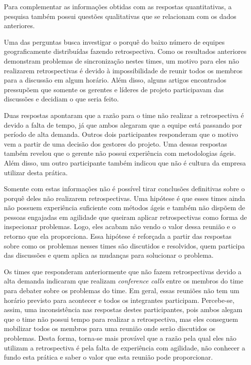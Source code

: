 Para complementar as informações obtidas com as respostas quantitativas, a pesquisa também possui questões qualitativas que se relacionam com os dados anteriores. 

Uma das perguntas busca investigar o porquê do baixo número de equipes geograficamente distribuídas fazendo retrospectiva. Como os resultados anteriores demonstram problemas de sincronização nestes times, um motivo para eles não realizarem retrospectivas é devido à impossibilidade de reunir todos os membros para a discussão em algum horário. Além disso, alguns artigos encontrados pressupõem que somente os gerentes e líderes de projeto participavam das discussões e decidiam o que seria feito.

Duas respostas apontaram que a razão para o time não realizar a retrospectiva é devido a falta de tempo, já que ambos alegaram que a equipe está passando por período de alta demanda. Outros dois participantes responderam que o motivo vem a partir de uma decisão dos gestores do projeto. Uma dessas respostas também revelou que o gerente não possui experiência com metodologias ágeis. Além disso, um outro participante também indicou que não é cultura da empresa utilizar desta prática. 

Somente com estas informações não é possível tirar conclusões definitivas sobre o porquê deles não realizarem retrospectivas. Uma hipótese é que esses times ainda não possuem experiência suficiente com métodos ágeis e também não dispõem de pessoas engajadas em agilidade que queiram aplicar retrospectivas como forma de inspecionar problemas. Logo, eles acabam não vendo o valor dessa reunião e o retorno que ela proporciona. Essa hipótese é reforçada a partir das respostas sobre como os problemas nesses times são discutidos e resolvidos, quem participa das discussões e quem aplica as mudanças para solucionar o problema.

Os times que responderam anteriormente que não fazem retrospectivas devido a alta demanda indicaram que realizam \textit{conference calls} entre os membros do time para debater sobre os problemas do time. Em geral, essas reuniões não tem um horário previsto para acontecer e todos os integrantes participam. Percebe-se, assim, uma inconsistência nas respostas destes participantes, pois ambos alegam que o time não possui tempo para realizar a retrospectiva, mas eles conseguem mobilizar todos os membros para uma reunião onde serão discutidos os problemas. Desta forma, torna-se mais provável que a razão pela qual eles não utilizam a retrospectiva é pela falta de experiência com agilidade, não conhecer a fundo esta prática e saber o valor que esta reunião pode proporcionar.

